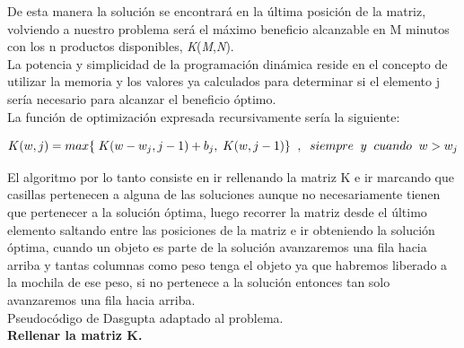 \documentclass[es]{ifirak}
\begin{document}
De esta manera la solución se encontrará en la última posición de la matriz, volviendo a nuestro problema será el máximo beneficio alcanzable en M minutos con los n productos disponibles, \textit{K}(\textit{M},\textit{N}).\\

La potencia y simplicidad de la programación dinámica reside en el concepto de utilizar la memoria y los valores ya calculados para determinar si el elemento j sería necesario para alcanzar el beneficio óptimo.\\

La función de optimización expresada recursivamente sería la siguiente:


$$K(w, j) = max\{ \hspace{0.1cm} K(w - w_{j}, j - 1) + b_{j} ,\hspace{0.1cm} K(w, j - 1) \} \hspace{0.2cm}, \hspace{0.2cm}siempre\hspace{0.2cm} y \hspace{0.2cm}cuando\hspace{0.2cm} w > w_{j}$$

El algoritmo por lo tanto consiste en ir rellenando la matriz K e ir marcando que casillas pertenecen a alguna de las soluciones aunque no necesariamente tienen que pertenecer a la solución óptima, luego recorrer la matriz desde el último elemento saltando entre las posiciones de la matriz e ir obteniendo la solución óptima, cuando un objeto es parte de la solución avanzaremos una fila hacia arriba y tantas columnas como peso tenga el objeto ya que habremos liberado a la mochila de ese peso, si no pertenece a la solución entonces tan solo avanzaremos una fila hacia arriba.\\

\pagebreak
Pseudocódigo de Dasgupta \cite{key-3} adaptado al problema.\\

\textbf{Rellenar la matriz K.}\\
\end{document}
